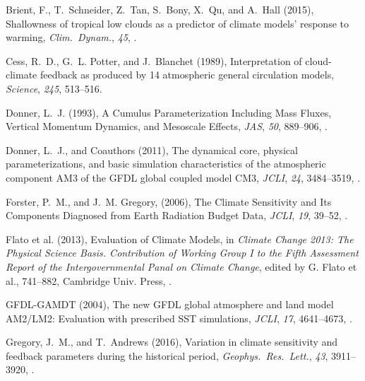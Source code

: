 \begin{thebibliography}{32}
Brient, F., T.~Schneider, Z.~Tan, S.~Bony, X.~Qu, and A.~Hall (2015),
  Shallowness of tropical low clouds as a predictor of climate models' response
  to warming, \textit{Clim.\ Dynam.}, \textit{45},
  .

Cess, R.~D., G.~L. Potter, and J.~Blanchet (1989), Interpretation of
  cloud-climate feedback as produced by 14 atmospheric general circulation
  models, \textit{Science}, \textit{245}, 513--516.

Donner, L.~J. (1993), A Cumulus Parameterization Including Mass Fluxes, 
Vertical Momentum Dynamics, and Mesoscale Effects, \textit{JAS},
  \textit{50}, 889--906, .

Donner, L.~J., and Coauthors (2011), The dynamical core, physical
  parameterizations, and basic simulation characteristics of the atmospheric
  component {AM3} of the {GFDL} global coupled model {CM3}, \textit{JCLI},
  \textit{24}, 3484--3519, .

Forster, P.~M., and J.~M. Gregory, (2006), The Climate Sensitivity and Its
Components Diagnosed from Earth Radiation Budget Data, \textit{JCLI}, 
\textit{19}, 39--52, .

Flato et al. (2013), Evaluation of Climate Models, in \textit{Climate Change 2013: The Physical Science Basis.  
Contribution of Working Group I to the Fifth Assessment Report of the Intergovernmental 
Panal on Climate Change}, edited by G. Flato et al., 741--882, Cambridge Univ.
Press, .

GFDL-GAMDT (2004), The new {GFDL} global atmosphere and land model {AM2}/{LM2}:
  Evaluation with prescribed {SST} simulations, \textit{JCLI}, \textit{17},
  4641--4673, .

Gregory, J.~M., and T.~Andrews (2016), Variation in climate sensitivity and
  feedback parameters during the historical period, \textit{Geophys.\ Res.\
  Lett.}, \textit{43}, 3911--3920, .


\end{thebibliography}

